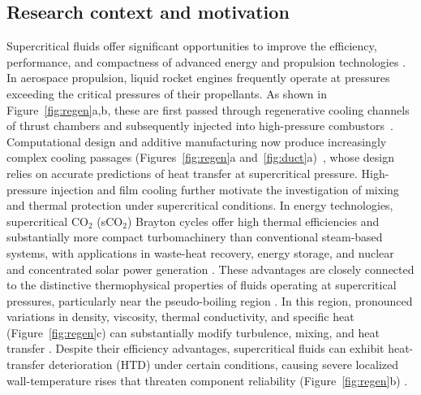 \documentclass[11pt]{article}
\begin{document}
\subsection{Research context and motivation}\label{sec:background}

Supercritical fluids offer significant opportunities to improve the efficiency, performance, and compactness of advanced energy and propulsion technologies \cite{Li2025,Guardone2024}.
In aerospace propulsion, liquid rocket engines frequently operate at pressures exceeding the critical pressures of their propellants.
As shown in Figure~\ref{fig:regen}a,b, these are first passed through regenerative cooling channels of thrust chambers and subsequently injected into high-pressure combustors~\cite{Nasuti2021,JofreUrzay2021}.
Computational design and additive manufacturing now produce increasingly complex cooling passages (Figures~\ref{fig:regen}a and~\ref{fig:duct}a)~\cite{LEAP71,Gradl2019}, whose design relies on accurate predictions of heat transfer at supercritical pressure.
High-pressure injection and film cooling further motivate the investigation of mixing and thermal protection under supercritical conditions.
In energy technologies, supercritical CO$_2$ (sCO$_2$) Brayton cycles offer high thermal efficiencies and substantially more compact turbomachinery than conventional steam-based systems, with applications in waste-heat recovery, energy storage, and nuclear and concentrated solar power generation \cite{Li2025,Guardone2024}.
These advantages are closely connected to the distinctive thermophysical properties of fluids operating at supercritical pressures, particularly near the pseudo-boiling region \cite{Banuti2015}.
In this region, pronounced variations in density, viscosity, thermal conductivity, and specific heat (Figure~\ref{fig:regen}c) can substantially modify turbulence, mixing, and heat transfer \cite{Li2025}.
Despite their efficiency advantages, supercritical fluids can exhibit heat-transfer deterioration (HTD) under certain conditions, causing severe localized wall-temperature rises that threaten component reliability (Figure~\ref{fig:regen}b) \cite{Pizzarelli2018,Nasuti2021,Li2025}.
\end{document}
